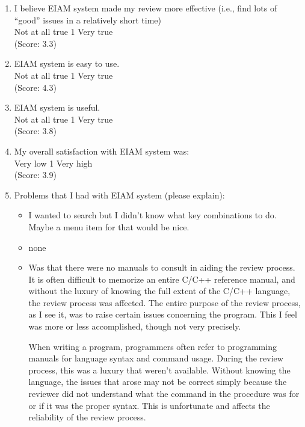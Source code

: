 \begin{enumerate}
\item  I believe EIAM system made my review more effective
(i.e., find lots of ``good'' issues in a relatively short time)
\\
Not at all true \hfill 1     \hfill Very true\\
(Score: 3.3)

\item  EIAM system is easy to use.
\\
Not at all true \hfill 1     \hfill Very true\\
(Score: 4.3)

\item  EIAM system is useful. 
\\
Not at all true \hfill 1     \hfill Very true\\
(Score: 3.8)

\item  My overall satisfaction with EIAM system was:
\\
Very low \hfill 1     \hfill Very high\\
(Score: 3.9)

\item  Problems that I had with EIAM system (please explain): 
\begin{itemize}
\item I wanted to search but I didn't know what key combinations to do.
Maybe a menu item for that would be nice.
\item none
\item Was that there were no manuals to consult in aiding the review
process.  It is often difficult to memorize an entire C/C++
reference manual, and without the luxury of knowing the full extent of
the C/C++ language, the review process was affected.  The entire
purpose of the review process, as I see it, was to raise certain
issues concerning the program.  This I feel was more or less
accomplished, though not very precisely.

When writing a program, programmers often refer to programming manuals
for language syntax and command usage.  During the review process,
this was a luxury that weren't available.  Without knowing the
language, the issues that arose may not be correct simply because the
reviewer did not understand what the command in the procedure was for
or if it was the proper syntax.  This is unfortunate and affects the
reliability of the review process.



\end{itemize}
\end{enumerate}
